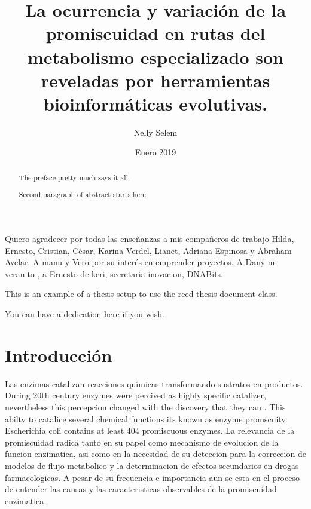 \documentclass[12pt,twoside]{reedthesis}
\title{La ocurrencia y variación de la promiscuidad en rutas del metabolismo
especializado son reveladas por herramientas bioinformáticas evolutivas.}
\author{Nelly Selem}
\date{Enero 2019}
\begin{document}
      \maketitle
  
  \frontmatter %
  \pagestyle{empty} %

      \begin{acknowledgements}
      Quiero agradecer por todas las enseñanzas a mis compañeros de trabajo
      Hilda, Ernesto, Cristian, César, Karina Verdel, Lianet, Adriana Espinosa
      y Abraham Avelar. A manu y Vero por su interés en emprender proyectos. A
      Dany mi veranito , a Ernesto de keri, secretaria inovacion, DNABits.
    \end{acknowledgements}
  
      \begin{preface}
      This is an example of a thesis setup to use the reed thesis document
      class.
    \end{preface}
  
      \hypersetup{linkcolor=black}
    \setcounter{tocdepth}{3}
    \tableofcontents
  
      \listoftables
  
      \listoffigures
  
      \begin{abstract}
      The preface pretty much says it all. \par  Second paragraph of abstract
      starts here.
    \end{abstract}
  
      \begin{dedication}
      You can have a dedication here if you wish.
    \end{dedication}
  
  \mainmatter %
  \pagestyle{fancyplain} %

  \chapter*{Introducción}\label{introduccion}
  
  Las enzimas catalizan reacciones químicas transformando sustratos en
  productos. During 20th century enzymes were percived as highly specific
  catalizer, nevertheless this percepcion changed with the discovery that
  they can . This abilty to catalice several chemical functions its known
  as enzyme promscuity. Escherichia coli contains at least 404 promiscuous
  enzymes. La relevancia de la promiscuidad radica tanto en su papel como
  mecanismo de evolucion de la funcion enzimatica, asi como en la
  necesidad de su deteccion para la correccion de modelos de flujo
  metabolico y la determinacion de efectos secundarios en drogas
  farmacologicas. A pesar de su frecuencia e importancia aun se esta en el
  proceso de entender las causas y las caracteristicas observables de la
  promiscuidad enzimatica.
  
\end{document}
